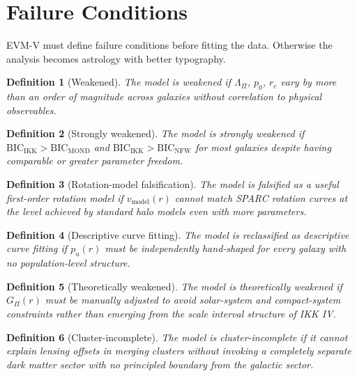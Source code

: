 \documentclass[11pt,a4paper,oneside]{article}
\newtheorem{definition}{Definition}[section]
\newcommand{\vmod}{v_{\mathrm{model}}}
\newcommand{\LamPi}{\Lambda_{\Pi}}
\newcommand{\pzero}{p_0}
\newcommand{\rc}{r_c}
\newcommand{\pu}{p_u}
\newcommand{\GPi}{G_{\Pi}}
\begin{document}
\section{Failure Conditions}

EVM-V must define failure conditions before fitting the data. Otherwise the analysis
becomes astrology with better typography.

\begin{definition}[Weakened]
The model is \emph{weakened} if $\LamPi$, $\pzero$, $\rc$ vary by more than an order
of magnitude across galaxies without correlation to physical observables.
\end{definition}

\begin{definition}[Strongly weakened]
The model is \emph{strongly weakened} if $\mathrm{BIC}_{\mathrm{IKK}} >
\mathrm{BIC}_{\mathrm{MOND}}$ and $\mathrm{BIC}_{\mathrm{IKK}} >
\mathrm{BIC}_{\mathrm{NFW}}$ for most galaxies despite having comparable or greater
parameter freedom.
\end{definition}

\begin{definition}[Rotation-model falsification]
The model is \emph{falsified as a useful first-order rotation model} if $\vmod(r)$
cannot match SPARC rotation curves at the level achieved by standard halo models even
with more parameters.
\end{definition}

\begin{definition}[Descriptive curve fitting]
The model is \emph{reclassified as descriptive curve fitting} if $\pu(r)$ must be
independently hand-shaped for every galaxy with no population-level structure.
\end{definition}

\begin{definition}[Theoretically weakened]
The model is \emph{theoretically weakened} if $\GPi(r)$ must be manually adjusted to
avoid solar-system and compact-system constraints rather than emerging from the scale
interval structure of IKK IV.
\end{definition}

\begin{definition}[Cluster-incomplete]
The model is \emph{cluster-incomplete} if it cannot explain lensing offsets in merging
clusters without invoking a completely separate dark matter sector with no principled
boundary from the galactic sector.
\end{definition}
\end{document}
